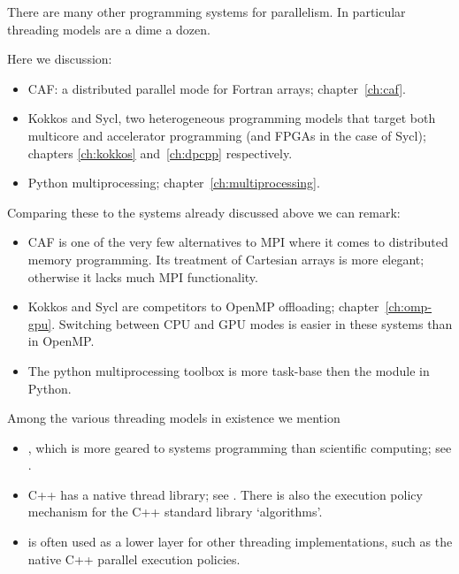 
There are many other programming systems for parallelism.
In particular threading models are a dime a dozen.

Here we discussion:
\begin{itemize}
\item \acf{CAF}: a distributed parallel mode for Fortran arrays;
  chapter~\ref{ch:caf}.
\item Kokkos and Sycl, two heterogeneous programming models that target
  both multicore and accelerator programming (and \acp{FPGA} in the case of Sycl);
  chapters \ref{ch:kokkos} and~\ref{ch:dpcpp} respectively.
\item Python multiprocessing; chapter~\ref{ch:multiprocessing}.
\end{itemize}

Comparing these to the systems already discussed above we can remark:
\begin{itemize}
\item \ac{CAF} is one of the very few alternatives to MPI where it
  comes to distributed memory programming.
  Its treatment of Cartesian arrays is more elegant; otherwise it lacks much MPI functionality.
\item Kokkos and Sycl are competitors to OpenMP offloading; chapter~\ref{ch:omp-gpu}.
  Switching between CPU and GPU modes is easier in these systems than in OpenMP.
\item The python multiprocessing toolbox is more task-base
  then the  module in Python.
\end{itemize}

Among the various threading models in existence we mention
\begin{itemize}
\item {}, which is more geared to systems programming than
  scientific computing; see .
\item C++ has a native thread library; see .
  There is also the execution policy mechanism for the C++ standard library `algorithms'.
\item {} is often used as a
  lower layer for other threading implementations, such as the native C++
  parallel execution policies.
\end{itemize}

